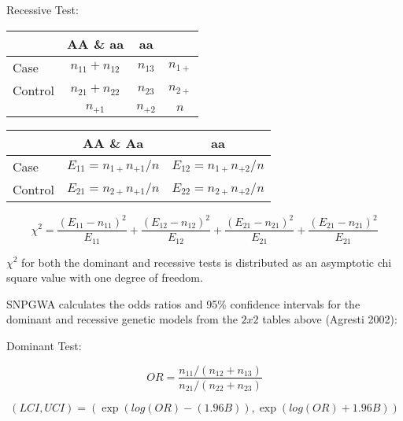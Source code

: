 \begin{enumerate}
\vspace{2em}
Recessive Test:

\vspace{2em}
\begin{center}
  \begin{tabular}{lccc}
    \hline
    {}     & \textbf{AA \& aa} & \textbf{aa} & {} \\
    \hline
    Case    & $n_{11} + n_{12}$   & $n_{13}$ & $n_{1+}$ \\
    Control & $n_{21} + n_{22}$   & $n_{23}$ & $n_{2+}$ \\
    {}     & $n_{+1}$           & $n_{+2}$ & $n$ \\
    \hline  
  \end{tabular}
\end{center}

\begin{center}
  \begin{tabular}{lcc}
    \hline
    {}     & \textbf{AA \& Aa}    & \textbf{aa} \\
    \hline
    Case    & $E_{11}=n_{1+}n_{+1}/n$ & $E_{12}=n_{1+}n_{+2}/n$ \\
    Control & $E_{21}=n_{2+}n_{+1}/n$ & $E_{22}=n_{2+}n_{+2}/n$ \\
    \hline
  \end{tabular}
\end{center}

\begin{equation*}
  \chi^2 = \frac{(E_{11}-n_{11})^2}{E_{11}} + \frac{(E_{12}-n_{12})^2}{E_{12}} +\frac{(E_{21}-n_{21})^2}{E_{21}} + \frac{(E_{21}-n_{21})^2}{E_{21}}
\end{equation*}

$\chi^2$ for both the dominant and recessive tests is distributed
as an asymptotic chi square value with one degree of freedom.

SNPGWA calculates the odds ratios and 95\% confidence intervals for the dominant
and recessive genetic models from the $2 x 2$ tables above (Agresti 2002):

Dominant Test:

\begin{equation*}
  OR = \frac{n_{11}/(n_{12}+n_{13})}{n_{21}/(n_{22}+n_{23})}
\end{equation*}

\begin{equation*}
  (LCI,UCI) = (\exp(log(OR) - (1.96B)), \exp(log(OR)+1.96B))
\end{equation*}


\end{enumerate}
